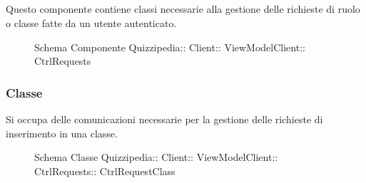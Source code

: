 \subsection{}
Questo componente contiene classi necessarie alla gestione delle richieste di ruolo o classe fatte da un utente autenticato.
\begin{figure}[H]
\centering
\noindent{}
\caption[Schema Componente Quizzipedia::Client::ViewModelClient::CtrlRequests]{Schema Componente Quizzipedia:: Client:: ViewModelClient:: CtrlRequests}
\end{figure}
\subsubsection{Classe }
Si occupa delle comunicazioni necessarie per la gestione delle richieste di inserimento in una classe.
\begin{figure}[H]
\centering
\noindent{}
\caption[Schema Classe CtrlRequestClass]{Schema Classe Quizzipedia:: Client:: ViewModelClient:: CtrlRequests:: CtrlRequestClass}
\end{figure}
